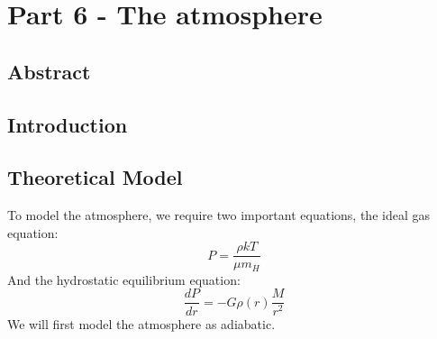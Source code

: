 \documentclass[a4paper,10pt,english]{article}
\begin{document}
\section{Part 6 - The atmosphere}
\subsection{Abstract}
\subsection{Introduction}
\subsection{Theoretical Model}
To model the atmosphere, we require two important equations, the ideal gas equation:
\begin{equation}
P=\frac{\rho k T}{\mu m_H}
\end{equation} 
And the hydrostatic equilibrium equation:
$$\frac{dP}{dr}=-G\rho(r)\frac{M}{r^2}$$
We will first model the atmosphere as adiabatic.
\end{document}
